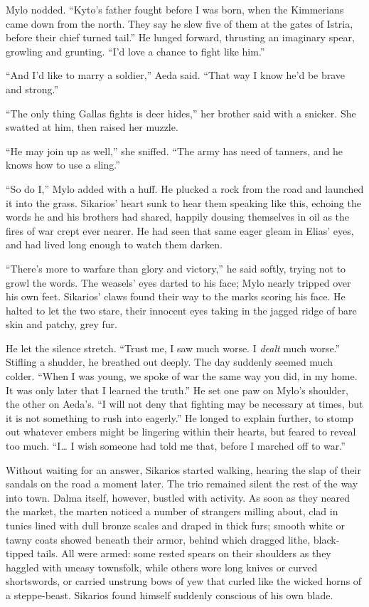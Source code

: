 Mylo nodded. ``Kyto's father fought before I was born, when the Kimmerians came down from the north. They say he slew five of them at the gates of Istria, before their chief turned tail.'' He lunged forward, thrusting an imaginary spear, growling and grunting. ``I'd love a chance to fight like him.''

``And I'd like to marry a soldier,'' Aeda said. ``That way I know he'd be brave and strong.''

``The only thing Gallas fights is deer hides,'' her brother said with a snicker. She swatted at him, then raised her muzzle.

``He may join up as well,'' she sniffed. ``The army has need of tanners, and he knows how to use a sling.''

``So do I,'' Mylo added with a huff. He plucked a rock from the road and launched it into the grass. Sikarios' heart sunk to hear them speaking like this, echoing the words he and his brothers had shared, happily dousing themselves in oil as the fires of war crept ever nearer. He had seen that same eager gleam in Elias' eyes, and had lived long enough to watch them darken.

``There's more to warfare than glory and victory,'' he said softly, trying not to growl the words. The weasels' eyes darted to his face; Mylo nearly tripped over his own feet. Sikarios' claws found their way to the marks scoring his face. He halted to let the two stare, their innocent eyes taking in the jagged ridge of bare skin and patchy, grey fur.

He let the silence stretch. ``Trust me, I saw much worse. I \emph{dealt} much worse.'' Stifling a shudder, he breathed out deeply. The day suddenly seemed much colder. ``When I was young, we spoke of war the same way you did, in my home. It was only later that I learned the truth.'' He set one paw on Mylo's shoulder, the other on Aeda's. ``I will not deny that fighting may be necessary at times, but it is not something to rush into eagerly.'' He longed to explain further, to stomp out whatever embers might be lingering within their hearts, but feared to reveal too much. ``I\ldots{} I wish someone had told me that, before I marched off to war.''

Without waiting for an answer, Sikarios started walking, hearing the slap of their sandals on the road a moment later. The trio remained silent the rest of the way into town. Dalma itself, however, bustled with activity. As soon as they neared the market, the marten noticed a number of strangers milling about, clad in tunics lined with dull bronze scales and draped in thick furs; smooth white or tawny coats showed beneath their armor, behind which dragged lithe, black-tipped tails. All were armed: some rested spears on their shoulders as they haggled with uneasy townsfolk, while others wore long knives or curved shortswords, or carried unstrung bows of yew that curled like the wicked horns of a steppe-beast. Sikarios found himself suddenly conscious of his own blade.


